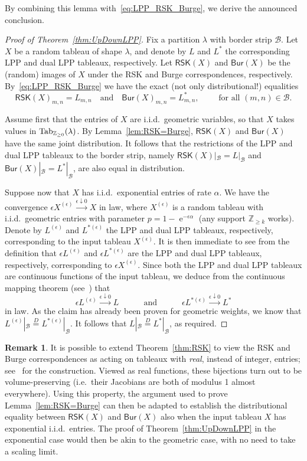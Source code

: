 \documentclass[a4paper,reqno,12pt]{amsart}
\theoremstyle{plain}
\theoremstyle{definition}
\newtheorem{rem}[thm]{Remark}
\newcommand{\Z}{\mathbb{Z}}
\newcommand{\tab}{\textnormal{Tab}}
\newcommand{\1}{\mathbbm{1}}
\DeclareMathOperator{\e}{\mathrm{e}}
\newcommand{\RSK}{\mathsf{RSK}}
\newcommand{\Burge}{\mathsf{Bur}}
\newcommand{\Fro}{\mathcal{B}}
\begin{document}
By combining this lemma with~\eqref{eq:LPP_RSK_Burge}, we derive the announced conclusion.
\begin{proof}[Proof of Theorem~\ref{thm:UpDownLPP}]
Fix a partition $\lambda$  with border strip $\Fro$.
Let $X$ be a random tableau of shape $\lambda$, and denote by $L$ and $L^*$ the corresponding LPP and dual LPP tableaux, respectively.
Let $\RSK(X)$ and $\Burge(X)$ be the (random) images of $X$ under the RSK and Burge correspondences, respectively.
By~\eqref{eq:LPP_RSK_Burge} we have the exact (not only distributional!) equalities 
\[
\RSK(X)_{m,n} = L_{m,n}\quad\text{and}\quad \Burge(X)_{m,n} = L^*_{m,n},\qquad\text{ for all $(m,n)\in\Fro$.}
\]

Assume first that the entries of $X$ are i.i.d.\ geometric variables, so that $X$ takes values in $\tab_{\Z_{\geq 0}}(\lambda)$.
By Lemma~\ref{lem:RSK=Burge}, $\RSK(X)$ and $\Burge(X)$ have the same joint distribution.
It follows that the restrictions of the LPP and dual LPP tableaux to the border strip, namely $\RSK(X)|_\Fro=L|_\Fro$ and $\Burge(X)|_\Fro=L^*|_\Fro$, are also equal in distribution.

Suppose now that $X$ has i.i.d.\ exponential entries of rate $\alpha$.
We have the convergence $\epsilon X^{(\epsilon)} \xrightarrow{\epsilon\downarrow 0} X$ in law, where $X^{(\epsilon)}$ is a random tableau with i.i.d.\ geometric entries with parameter $p=1-\e^{-\epsilon \alpha}$ (any support $\Z_{\geq k}$ works).
Denote by $L^{(\epsilon)}$ and $L^{*(\epsilon)}$ the LPP and dual LPP tableaux, respectively, corresponding to the input tableau $X^{(\epsilon)}$.
It is then immediate to see from the definition that $\epsilon L^{(\epsilon)}$ and $\epsilon L^{*(\epsilon)}$ are the LPP and dual LPP tableaux, respectively, corresponding to $\epsilon X^{(\epsilon)}$.
Since both the LPP and dual LPP tableaux are continuous functions of the input tableau, we deduce from the continuous mapping theorem (see~\cite[Theorem~3.2.10]{durrett19}) that
\[
\epsilon L^{(\epsilon)} \xrightarrow{\epsilon\downarrow 0} L
\qquad\quad \text{and} \qquad\quad
\epsilon L^{*(\epsilon)} \xrightarrow{\epsilon\downarrow 0} L^*
\]
in law.
As the claim has already been proven for geometric weights, we know that $L^{(\epsilon)}|_\Fro \overset{D}{=} L^{*(\epsilon)}|_\Fro$.
It follows that $L|_\Fro \overset{D}{=} L^*|_\Fro$, as required.
\end{proof}

\begin{rem}
It is possible to extend Theorem~\ref{thm:RSK} to view the RSK and Burge correspondences as acting on tableaux with \emph{real}, instead of integer, entries; see~\cite[\S~2]{bisiOConnellZygouras20} for the construction.
Viewed as real functions, these bijections turn out to be volume-preserving (i.e.\ their Jacobians are both of modulus 1 almost everywhere).
Using this property, the argument used to prove Lemma~\ref{lem:RSK=Burge} can then be adapted to establish the distributional equality between $\RSK(X)$ and $\Burge(X)$ also when the input tableau $X$ has exponential i.i.d.\ entries.
The proof of Theorem~\eqref{thm:UpDownLPP} in the exponential case would then be akin to the geometric case, with no need to take a scaling limit.
\end{rem}
\end{document}
